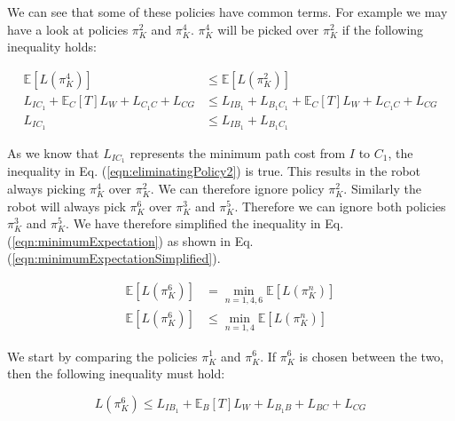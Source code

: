 \documentclass[a4paper,12pt]{article}
\begin{document}
			We can see that some of these policies have common terms. For example we may have a look at policies $\pi_{K}^{2}$ and $\pi_{K}^{4}$. $\pi_{K}^{4}$ will be picked over $\pi_{K}^{2}$ if the following inequality holds:
			
			\begin{equation}
			\begin{split}
			\mathbb{E}\left[L\left(\pi_{K}^{4}\right)\right] &\leq \mathbb{E}\left[L\left(\pi_{K}^{2}\right)\right] \\
			L_{IC_1} + \mathbb{E}_{C}\left[T\right]L_W + L_{C_1C} + L_{CG} &\leq L_{IB_1} + L_{B_1C_1} + \mathbb{E}_{C}\left[T\right]L_W + L_{C_1C} + L_{CG} \\
			L_{IC_1} &\leq L_{IB_1} + L_{B_1C_1}
			\end{split}
			\label{eqn:eliminatingPolicy2}
			\end{equation}
			
			As we know that $L_{IC_1}$ represents the minimum path cost from $I$ to $C_1$, the inequality in Eq. (\ref{eqn:eliminatingPolicy2}) is true. This results in the robot always picking $\pi_{K}^{4}$ over $\pi_{K}^{2}$. We can therefore ignore policy $\pi_{K}^{2}$. Similarly the robot will always pick $\pi_{K}^{6}$ over $\pi_{K}^{3}$ and $\pi_{K}^{5}$. Therefore we can ignore both policies $\pi_{K}^{3}$ and $\pi_{K}^{5}$. We have therefore simplified the inequality in Eq. (\ref{eqn:minimumExpectation}) as shown in Eq. (\ref{eqn:minimumExpectationSimplified}).
			
			\begin{equation}
			\begin{split}
				\mathbb{E}\left[L\left(\pi_{K}^{6}\right)\right] &= \min_{n=1,4,6} \mathbb{E}\left[L\left(\pi_{K}^{n}\right)\right] \\ 
				\mathbb{E}\left[L\left(\pi_{K}^{6}\right)\right] &\leq \min_{n=1,4} \mathbb{E}\left[L\left(\pi_{K}^{n}\right)\right]
			\end{split}
			\label{eqn:minimumExpectationSimplified}
			\end{equation}
			
			We start by comparing the policies $\pi_{K}^{1}$ and $\pi_{K}^{6}$. If $\pi_{K}^{6}$ is chosen between the two, then the following inequality must hold:
			
			\begin{equation}
			L\left(\pi_{K}^{6}\right) \leq L_{IB_1} + \mathbb{E}_{B}\left[T\right]L_W + L_{B_1B} + L_{BC} + L_{CG}
			\label{eqn:policyOneInequlaity}
			\end{equation}
			
\end{document}
